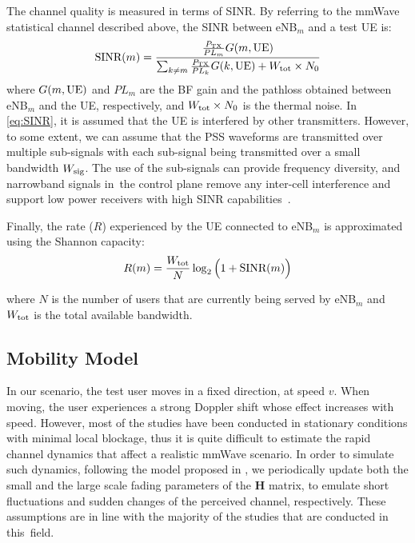 \documentclass[conference]{IEEEtran}
\begin{document}
The channel quality is measured in terms of SINR. By referring to the mmWave statistical channel described above, the SINR between eNB$_m$ and a test UE is:
\begin{equation}
\text{SINR}( m) = \frac{\frac{P_{\rm TX}}{PL_{ m}}G{(m, \rm UE)}}{\sum_{k\neq m}\frac{P_{\rm TX}}{PL_{ k}}G({ k,\rm UE})+W_{\rm tot}\times N_0}
\vspace{0.5cm}
\label{eq:SINR}
\end{equation}
where $G({ m,\rm UE})$ and $PL_{ m}$ are the BF gain and the pathloss obtained between eNB$_{m}$ and the UE, respectively, and ${ W_{\rm tot}\times N_0}$ is the thermal noise.
In \eqref{eq:SINR}, it is assumed that the UE is interfered by other transmitters. However, to some extent, we can assume that the PSS waveforms are transmitted over multiple sub-signals with each sub-signal being transmitted over a small bandwidth $W_{\rm sig}$. 
The use of the sub-signals can provide frequency diversity, and narrowband signals in~the control plane  remove any inter-cell interference and support  low power receivers with high SINR capabilities~\cite{giordani2016uplink,Barati_IA}.

Finally, the rate ($R$) experienced by the UE connected to eNB$_{m}$ is approximated using the Shannon capacity:
\begin{equation}
R({m)} = \frac{W_{\rm tot}}{N}  \log_2\Big(1+\text{SINR}(m)\Big)
\label{eq:rate}
\end{equation}

where $N$ is the  number of users that are currently being served by eNB$_m$ and $W_{\rm tot}$ is the total available  bandwidth.



\subsection{Mobility Model}
\label{sec:mobility}


In our scenario, the test user moves in a fixed direction, at   speed $v$. 
When moving, the user experiences a strong Doppler shift  whose effect increases with speed.
However, most of the studies have been conducted in stationary
conditions with minimal local blockage, thus it is quite difficult to estimate the rapid channel dynamics
that affect a realistic mmWave scenario.
In order to simulate such  dynamics, following the model proposed in \cite{ giordani2016uplink}, we periodically update both the small and the large scale fading parameters of the \textbf{H} matrix, to emulate short fluctuations and sudden changes of the perceived channel, respectively. These assumptions are in line with the majority of the studies that are conducted in this~field.
\end{document}
